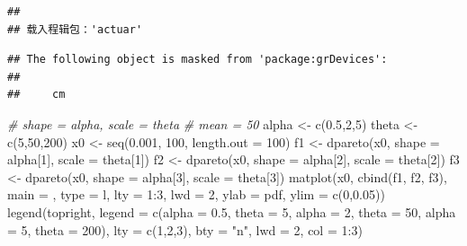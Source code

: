 \documentclass[
]{book}
\newenvironment{Shaded}{\begin{snugshade}}{\end{snugshade}}
\newcommand{\AttributeTok}[1]{\textcolor[rgb]{0.77,0.63,0.00}{#1}}
\newcommand{\CommentTok}[1]{\textcolor[rgb]{0.56,0.35,0.01}{\textit{#1}}}
\newcommand{\DecValTok}[1]{\textcolor[rgb]{0.00,0.00,0.81}{#1}}
\newcommand{\FloatTok}[1]{\textcolor[rgb]{0.00,0.00,0.81}{#1}}
\newcommand{\FunctionTok}[1]{\textcolor[rgb]{0.00,0.00,0.00}{#1}}
\newcommand{\NormalTok}[1]{#1}
\newcommand{\OtherTok}[1]{\textcolor[rgb]{0.56,0.35,0.01}{#1}}
\newcommand{\SpecialCharTok}[1]{\textcolor[rgb]{0.00,0.00,0.00}{#1}}
\newcommand{\StringTok}[1]{\textcolor[rgb]{0.31,0.60,0.02}{#1}}
\begin{document}
\begin{verbatim}
## 
## 载入程辑包：'actuar'
\end{verbatim}

\begin{verbatim}
## The following object is masked from 'package:grDevices':
## 
##     cm
\end{verbatim}

\begin{Shaded}
\begin{Highlighting}[]
\CommentTok{\# shape = alpha, scale = theta}
\CommentTok{\# mean = 50}
\NormalTok{alpha }\OtherTok{\textless{}{-}} \FunctionTok{c}\NormalTok{(}\FloatTok{0.5}\NormalTok{,}\DecValTok{2}\NormalTok{,}\DecValTok{5}\NormalTok{)              }
\NormalTok{theta }\OtherTok{\textless{}{-}} \FunctionTok{c}\NormalTok{(}\DecValTok{5}\NormalTok{,}\DecValTok{50}\NormalTok{,}\DecValTok{200}\NormalTok{)     }
\NormalTok{x0 }\OtherTok{\textless{}{-}} \FunctionTok{seq}\NormalTok{(}\FloatTok{0.001}\NormalTok{, }\DecValTok{100}\NormalTok{, }\AttributeTok{length.out =} \DecValTok{100}\NormalTok{)}
\NormalTok{f1 }\OtherTok{\textless{}{-}} \FunctionTok{dpareto}\NormalTok{(x0,  }\AttributeTok{shape =}\NormalTok{ alpha[}\DecValTok{1}\NormalTok{], }\AttributeTok{scale =}\NormalTok{ theta[}\DecValTok{1}\NormalTok{])}
\NormalTok{f2 }\OtherTok{\textless{}{-}} \FunctionTok{dpareto}\NormalTok{(x0,  }\AttributeTok{shape =}\NormalTok{ alpha[}\DecValTok{2}\NormalTok{], }\AttributeTok{scale =}\NormalTok{ theta[}\DecValTok{2}\NormalTok{])}
\NormalTok{f3 }\OtherTok{\textless{}{-}} \FunctionTok{dpareto}\NormalTok{(x0,  }\AttributeTok{shape =}\NormalTok{ alpha[}\DecValTok{3}\NormalTok{], }\AttributeTok{scale =}\NormalTok{ theta[}\DecValTok{3}\NormalTok{])}
\FunctionTok{matplot}\NormalTok{(x0, }\FunctionTok{cbind}\NormalTok{(f1, f2, f3), }\AttributeTok{main =} \StringTok{\textquotesingle{}\textquotesingle{}}\NormalTok{,  }\AttributeTok{type =} \StringTok{\textquotesingle{}l\textquotesingle{}}\NormalTok{, }
        \AttributeTok{lty =} \DecValTok{1}\SpecialCharTok{:}\DecValTok{3}\NormalTok{, }\AttributeTok{lwd =} \DecValTok{2}\NormalTok{, }\AttributeTok{ylab =} \StringTok{\textquotesingle{}pdf\textquotesingle{}}\NormalTok{, }\AttributeTok{ylim =} \FunctionTok{c}\NormalTok{(}\DecValTok{0}\NormalTok{,}\FloatTok{0.05}\NormalTok{))}
\FunctionTok{legend}\NormalTok{(}\StringTok{\textquotesingle{}topright\textquotesingle{}}\NormalTok{, }\AttributeTok{legend =} \FunctionTok{c}\NormalTok{(}\StringTok{\textquotesingle{}alpha = 0.5, theta = 5\textquotesingle{}}\NormalTok{, }
                              \StringTok{\textquotesingle{}alpha = 2, theta = 50\textquotesingle{}}\NormalTok{, }
                              \StringTok{\textquotesingle{}alpha = 5, theta = 200\textquotesingle{}}\NormalTok{),}
       \AttributeTok{lty =} \FunctionTok{c}\NormalTok{(}\DecValTok{1}\NormalTok{,}\DecValTok{2}\NormalTok{,}\DecValTok{3}\NormalTok{), }\AttributeTok{bty =} \StringTok{"n"}\NormalTok{, }\AttributeTok{lwd =} \DecValTok{2}\NormalTok{,  }\AttributeTok{col =} \DecValTok{1}\SpecialCharTok{:}\DecValTok{3}\NormalTok{)}
\end{Highlighting}
\end{Shaded}
\end{document}
